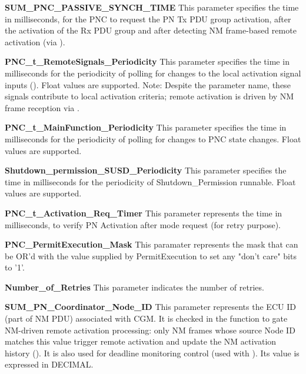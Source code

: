 \textbf{SUM\_PNC\_PASSIVE\_SYNCH\_TIME}\newline
This parameter specifies the time in milliseconds, for the PNC to request the PN Tx PDU group activation, after the activation of the Rx PDU group and after detecting NM frame-based remote activation (via ).

\textbf{PNC\_t\_RemoteSignals\_Periodicity }\newline
This parameter specifies the time in milliseconds for the periodicity of polling for changes to the local activation signal inputs (). Float values are supported. Note: Despite the parameter name, these signals contribute to local activation criteria; remote activation is driven by NM frame reception via .

\textbf{PNC\_t\_MainFunction\_Periodicity}\newline
This parameter specifies the time in milliseconds for the periodicity of polling for changes to PNC state changes. Float values are supported.


\textbf{Shutdown\_permission\_SUSD\_Periodicity}\newline
This parameter specifies the time in milliseconds for the periodicity of Shutdown\_Permission runnable. Float values are supported. 


\textbf{PNC\_t\_Activation\_Req\_Timer }\newline
This parameter represents the time in milliseconds, to verify PN Activation after mode request (for retry purpose).

\textbf{PNC\_PermitExecution\_Mask}\newline
This paramater represents the mask that can be OR'd with the value supplied by PermitExecution to set any "don't care" bits to '1'.

\textbf{Number\_of\_Retries}\newline
This parameter indicates the number of retries.

\textbf{SUM\_PN\_Coordinator\_Node\_ID}\newline
This parameter represents the ECU ID (part of NM PDU) associated with CGM. It is checked in the function  to gate NM-driven remote activation processing: only NM frames whose source Node ID matches this value trigger remote activation and update the NM activation history (). It is also used for deadline monitoring control (used with ). Its value is expressed in DECIMAL. 


